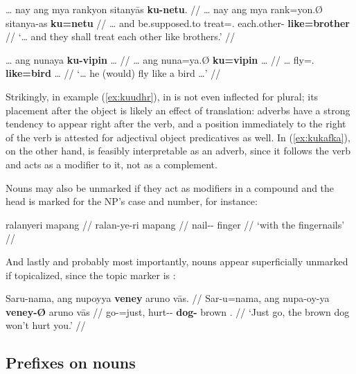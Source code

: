 \pex
\a\label{ex:kuudhr}\begingl
	\gla … nay ang mya rankyon sitanyās \textbf{ku-netu}. //
	\glb … nay ang mya rank=yon.Ø sitanya-as \textbf{ku=netu} //
	\glc … and \AgtT{} be.supposed.to treat=\TplN{}.\Top{} 
		each.other-\Parg{} \textbf{like=brother} //
	\glft `… and they shall treat each other like brothers.'\footnotemark%
	//
\endgl

\a\label{ex:kukafka}\begingl
	\gla … ang nunaya \textbf{ku-vipin} … //
	\glb … ang nuna=ya.Ø \textbf{ku=vipin} … //
	\glc … \AgtT{} fly=\TsgM{}.\Top{} \textbf{like=bird} … //
	\glft `… he (would) fly like a bird …'%
	//
\endgl

\xe


Strikingly, in example (\ref{ex:kuudhr}),  in 
 is not even inflected for plural; its 
placement after the object is likely an effect of translation: adverbs 
have a strong tendency to appear right after the verb, and a position 
immediately to the right of the verb is attested for adjectival object 
predicatives as well. In (\ref{ex:kukafka}), on the other hand, 
 is feasibly interpretable as an adverb, 
since it follows the verb and acts as a modifier to it, not as a complement.

Nouns may also be unmarked if they act as modifiers in a compound and the head 
is marked for the NP's case and number, for instance:

\ex\begingl
	\gla ralanyeri mapang //
	\glb ralan-ye-ri mapang //
	\glc nail-\Pl{}-\Ins{} finger //
	\glft `with the fingernails' //
\endgl\xe

And lastly and probably most importantly, nouns appear superficially unmarked 
if topicalized, since the topic marker is :

\ex\begingl
	\gla Saru-nama, ang nupoyya \textbf{veney} aruno vās. //
	\glb Sar-u=nama, ang nupa-oy-ya \textbf{veney-Ø} aruno vās //
	\glc go-\Imp{}=just, \AgtT{} hurt-\Neg{}-\TsgM{} \textbf{dog-\Top{}} 
 		brown \Ssg{}.\Parg{} //
	\glft `Just go, the brown dog won't hurt you.' //
\endgl\xe


\subsection{Prefixes on nouns}

